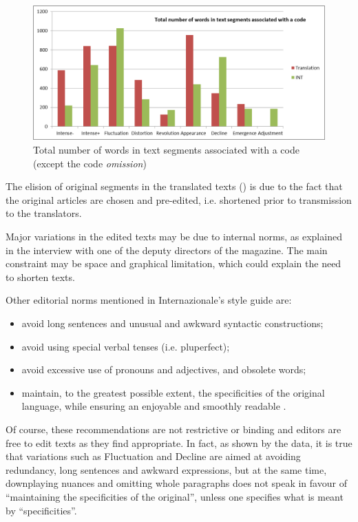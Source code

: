 \documentclass[output=paper]{LSP/langsci}
\begin{document}
\begin{figure}
\includegraphics[width=\textwidth]{figures/troqe-marchan/figure5.png}
\caption{Total number of words in text segments associated with a code (except the code \textit{omission})} 
\label{troqe-marchan:fig:5}
\end{figure}

The elision of original segments in the translated texts () is due to the fact that the original articles are chosen and pre-edited, i.e. shortened prior to transmission to the translators. 

Major variations in the edited texts may be due to internal norms, as explained in the interview with one of the deputy directors of the magazine. The main constraint may be space and graphical limitation, which could explain the need to shorten texts. 

\newpage 
Other editorial norms mentioned in Internazionale's  style guide are: 

\begin{itemize}
 \item avoid long sentences and unusual and awkward syntactic constructions;
 \item avoid using special verbal tenses (i.e. pluperfect);
 \item avoid excessive use of pronouns and adjectives, and obsolete words;
 \item maintain, to the greatest possible extent, the specificities of the original language, while ensuring an enjoyable and smoothly readable .
\end{itemize}


Of course, these recommendations are not restrictive or binding and editors are free to edit texts as they find appropriate. In fact, as shown by the data, it is true that variations such as Fluctuation and Decline are aimed at avoiding redundancy, long sentences and awkward expressions, but at the same time, downplaying nuances and omitting whole paragraphs does not speak in favour of ``maintaining the specificities of the original'', unless one specifies what is meant by ``specificities''.
\end{document}
